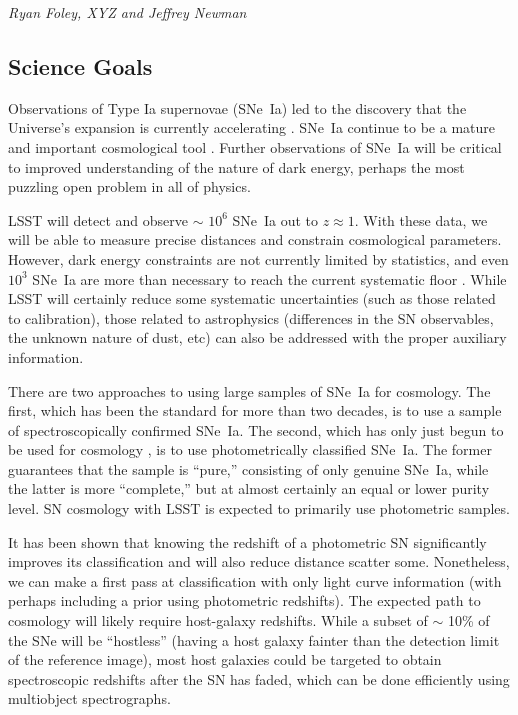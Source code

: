 {\it Ryan Foley, XYZ and Jeffrey Newman }


\subsection{Science Goals}

Observations of Type Ia supernovae (SNe~Ia) led to the discovery that
the Universe's expansion is currently accelerating
\citep{Riess98:Lambda, Perlmutter99}.  SNe~Ia continue to be a mature
and important cosmological tool \citep[e.g.,][]{Suzuki12, Betoule14,
Rest14}.  Further observations of SNe~Ia will be critical to
improved understanding of the nature of dark energy, perhaps the most
puzzling open problem in all of physics.

LSST will detect and observe $\sim$ $10^{6}$ SNe~Ia out to $z \approx
1$.  With these data, we will be able to measure precise distances and
constrain cosmological parameters.  However, dark energy constraints
are not currently limited by statistics, and even $10^{3}$ SNe~Ia are
more than necessary to reach the current systematic floor
\citep{Betoule14, Scolnic14:ps1}.  While LSST will certainly reduce
some systematic uncertainties (such as those related to calibration),
those related to astrophysics (differences in the SN observables, the
unknown nature of dust, etc) can also be addressed with the proper
auxiliary information.

There are two approaches to using large samples of SNe~Ia for
cosmology.  The first, which has been the standard for more than two
decades, is to use a sample of spectroscopically confirmed SNe~Ia.
The second, which has only just begun to be used for cosmology
\citep{Campbell13}, is to use photometrically classified SNe~Ia.  The
former guarantees that the sample is ``pure,'' consisting of only
genuine SNe~Ia, while the latter is more ``complete,'' but at almost
certainly an equal or lower purity level.  SN
cosmology with LSST is expected to primarily use photometric samples.

It has been shown that knowing the redshift of a photometric SN significantly
improves its classification and will also reduce distance scatter
some.  Nonetheless, we can make a first pass at classification with
only light curve information (with perhaps including a prior using
photometric redshifts).  The expected path to cosmology will likely
require host-galaxy redshifts.  While a subset of $\sim$ 10\% of the
SNe will be ``hostless'' (having a host galaxy fainter than the
detection limit of the reference image), most host galaxies could be
targeted to obtain spectroscopic redshifts after the SN has faded, which can be done efficiently using multiobject spectrographs.  

